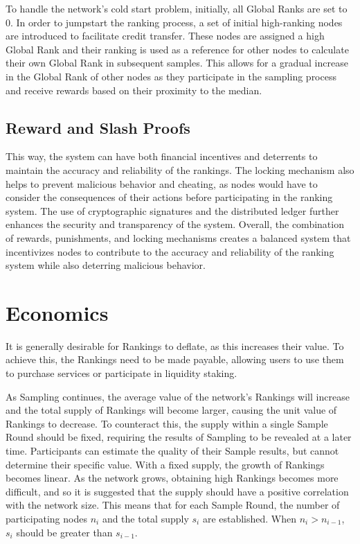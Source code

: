 \documentclass[twocolumn]{article}
\begin{document}
To handle the network's cold start problem, initially, all Global Ranks are set to 0. In order to jumpstart the ranking process, a set of initial high-ranking nodes are introduced to facilitate credit transfer. These nodes are assigned a high Global Rank and their ranking is used as a reference for other nodes to calculate their own Global Rank in subsequent samples. This allows for a gradual increase in the Global Rank of other nodes as they participate in the sampling process and receive rewards based on their proximity to the median.
\subsection{Reward and Slash Proofs}

This way, the system can have both financial incentives and deterrents to maintain the accuracy and reliability of the rankings. The locking mechanism also helps to prevent malicious behavior and cheating, as nodes would have to consider the consequences of their actions before participating in the ranking system. The use of cryptographic signatures and the distributed ledger further enhances the security and transparency of the system. Overall, the combination of rewards, punishments, and locking mechanisms creates a balanced system that incentivizes nodes to contribute to the accuracy and reliability of the ranking system while also deterring malicious behavior.

\section{Economics}

It is generally desirable for Rankings to deflate, as this increases their value. To achieve this, the Rankings need to be made payable, allowing users to use them to purchase services or participate in liquidity staking.

As Sampling continues, the average value of the network's Rankings will increase and the total supply of Rankings will become larger, causing the unit value of Rankings to decrease. To counteract this, the supply within a single Sample Round should be fixed, requiring the results of Sampling to be revealed at a later time. Participants can estimate the quality of their Sample results, but cannot determine their specific value. With a fixed supply, the growth of Rankings becomes linear. As the network grows, obtaining high Rankings becomes more difficult, and so it is suggested that the supply should have a positive correlation with the network size. This means that for each Sample Round, the number of participating nodes $n_i$ and the total supply $s_i$ are established. When $n_i > n_{i-1}$, $s_i$ should be greater than $s_{i-1}$.
\end{document}

